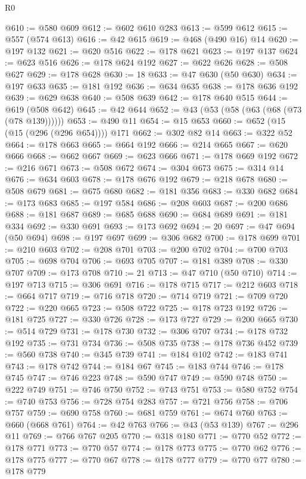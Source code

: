 \begin{lexlean}{R0}
\begin{coremodule}
@610 := @580 @609
@612 := @602 @610 @283
@613 := @599 @612
@615 := @557 (@574 @613)
@616 := @42 @615
@619 := @468 (@490 @16) @14
@620 := @197 @132
@621 := @620 @516
@622 := @178 @621
@623 := @197 @137
@624 := @623 @516
@626 := @178 @624 @192
@627 := @622 @626
@628 := @508 @627
@629 := @178 @628
@630 := 18
@633 := @47 @630 (@50 @630)
@634 := @197 @633
@635 := @181 @192
@636 := @634 @635
@638 := @178 @636 @192
@639 := @629 @638
@640 := @508 @639
@642 := @178 @640 @515
@644 := @619 (@508 @642)
@645 := @42 @644
@652 := @43 (@53 (@58 (@63 (@68 (@73 (@78 @139))))))
@653 := @490 @11
@654 := @15 @653
@660 := @652 (@15 (@15 (@296 (@296 @654)))) @171
@662 := @302 @82 @14
@663 := @322 @52
@664 := @178 @663
@665 := @664 @192
@666 := @214 @665
@667 := @620 @666
@668 := @662 @667
@669 := @623 @666
@671 := @178 @669 @192
@672 := @216 @671
@673 := @508 @672
@674 := @304 @673
@675 := @314 @14
@676 := @634 @603
@678 := @178 @676 @192
@679 := @218 @678
@680 := @508 @679
@681 := @675 @680
@682 := @181 @356
@683 := @330 @682
@684 := @173 @683
@685 := @197 @584
@686 := @208 @603
@687 := @200 @686
@688 := @181 @687
@689 := @685 @688
@690 := @684 @689
@691 := @181 @334
@692 := @330 @691
@693 := @173 @692
@694 := 20
@697 := @47 @694 (@50 @694)
@698 := @197 @697
@699 := @306 @682
@700 := @178 @699
@701 := @210 @603
@702 := @208 @701
@703 := @200 @702
@704 := @700 @703
@705 := @698 @704
@706 := @693 @705
@707 := @181 @389
@708 := @330 @707
@709 := @173 @708
@710 := 21
@713 := @47 @710 (@50 @710)
@714 := @197 @713
@715 := @306 @691
@716 := @178 @715
@717 := @212 @603
@718 := @664 @717
@719 := @716 @718
@720 := @714 @719
@721 := @709 @720
@722 := @220 @665
@723 := @508 @722
@725 := @178 @723 @192
@726 := @181 @725
@727 := @330 @726
@728 := @173 @727
@729 := @200 @665
@730 := @514 @729
@731 := @178 @730
@732 := @306 @707
@734 := @178 @732 @192
@735 := @731 @734
@736 := @508 @735
@738 := @178 @736 @452
@739 := @560 @738
@740 := @345 @739
@741 := @184 @102
@742 := @183 @741
@743 := @178 @742
@744 := @184 @67
@745 := @183 @744
@746 := @178 @745
@747 := @746 @223
@748 := @590 @747
@749 := @590 @748
@750 := @222 @749
@751 := @746 @750
@752 := @743 @751
@753 := @580 @752
@754 := @740 @753
@756 := @728 @754 @283
@757 := @721 @756
@758 := @706 @757
@759 := @690 @758
@760 := @681 @759
@761 := @674 @760
@763 := @660 (@668 @761)
@764 := @42 @763
@766 := @43 (@53 @139)
@767 := @296 @11
@769 := @766 @767 @205
@770 := @318 @180
@771 := @770 @52
@772 := @178 @771
@773 := @770 @57
@774 := @178 @773
@775 := @770 @62
@776 := @178 @775
@777 := @770 @67
@778 := @178 @777
@779 := @770 @77
@780 := @178 @779

\end{coremodule}
\end{lexlean}
